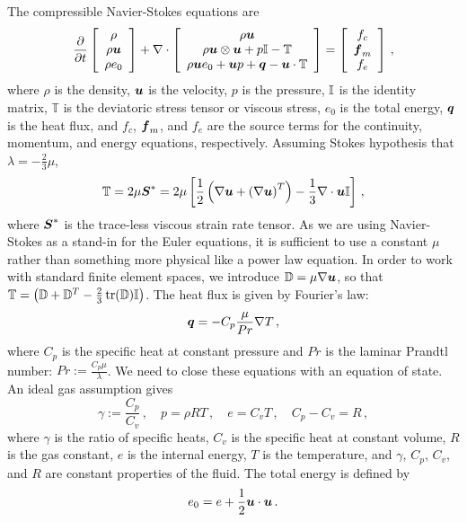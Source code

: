\documentclass[Dissertation.tex]{subfiles}
\begin{document}
The compressible Navier-Stokes equations are
\begin{align}
\frac{\partial}{\partial t}\left[ \begin{array}{c} \rho\\ \rho\boldsymbol u\\ \rho e_0\\ \end{array} \right]
+\nabla\cdot\left[ \begin{array}{c} \rho\boldsymbol u\\ \rho\boldsymbol u\otimes\boldsymbol u+p\mathbb{I}-\mathbb{T}\\ \rho\boldsymbol u e_0+\boldsymbol u p+\boldsymbol q-\boldsymbol u\cdot\mathbb{T}\\ \end{array} \right]
=\left[ \begin{array}{c} f_c\\ \boldsymbol f_m\\ f_e\\ \end{array} \right]\,,
\end{align}
where $\rho$ is the density, $\boldsymbol u$ is the velocity, $p$ is the pressure, $\mathbb{I}$ is the identity matrix,
$\mathbb{T}$ is the deviatoric stress tensor or viscous stress, $e_0$ is the total energy, $\boldsymbol q$ is the heat flux, 
and $f_c$, $\boldsymbol f_m$, and $f_e$ are the source terms for the continuity, momentum, and energy equations, respectively.
Assuming Stokes hypothesis that $\lambda=-\frac{2}{3}\mu$, 
\begin{equation*}
	\mathbb{T}=2\mu\boldsymbol S^*=2\mu\left[ \frac{1}{2}\left( \nabla\boldsymbol u+\left( \nabla\boldsymbol u \right)^T \right)-\frac{1}{3}\nabla\cdot\boldsymbol u\mathbb{I} \right]\,,
\end{equation*}
where $\boldsymbol S^*$ is the trace-less viscous strain rate tensor.
As we are using Navier-Stokes as a stand-in for the Euler equations, it is sufficient to
use a constant $\mu$ rather than something more physical like a power law equation.
In order to work with standard finite element spaces, we introduce $\mathbb{D}=\mu\nabla\boldsymbol u$, so that 
$\mathbb{T}=\left( \mathbb{D}+\mathbb{D}^T-\frac{2}{3}\operatorname*{tr}(\mathbb{D})\mathbb{I} \right)$.
The heat flux is given by Fourier's law:
\begin{equation*}
	\boldsymbol q=-C_p\frac{\mu}{Pr}\nabla T\,,
\end{equation*}
where $C_p$ is the specific heat at constant pressure and $Pr$ is the laminar Prandtl number: $Pr:=\frac{C_p\mu}{\lambda}$.
We need to close these equations with an equation of state. An ideal gas assumption gives
\begin{equation*}
	\gamma:=\frac{C_p}{C_v}\,,\quad p=\rho RT\,,\quad e=C_v T\,,\quad C_p-C_v=R\,,
\end{equation*}
where $\gamma$ is the ratio of specific heats, $C_v$ is the specific heat at constant volume, $R$ is the gas constant,
$e$ is the internal energy, $T$ is the temperature,
and $\gamma$, $C_p$, $C_v$, and $R$ are constant properties of the fluid.
The total energy is defined by
\begin{equation*}
	e_0=e+\frac{1}{2}\boldsymbol u\cdot\boldsymbol u\,.
\end{equation*}
\end{document}
